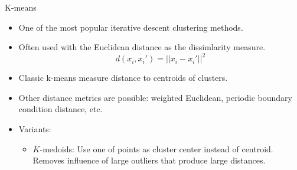 \documentclass[aspectratio=169]{beamer}
\begin{document}
\begin{frame}{K-means}
    \begin{itemize}
        \item One of the most popular iterative descent clustering methods.
        \item Often used with the Euclidean distance as the dissimlarity measure.
        \begin{equation*}
            d(x_i, x_i') = ||x_i - x_i'||^2
        \end{equation*}
        \item Classic k-means measure distance to centroids of clusters.
        \item Other distance metrics are possible: weighted Euclidean, periodic boundary condition distance, etc.
        \item Variants:
        \begin{itemize}
            \item $K$-medoids: Use one of points as cluster center instead of centroid. Removes influence of large outliers that produce large distances.
        \end{itemize}
    \end{itemize}
\end{frame}
\end{document}
